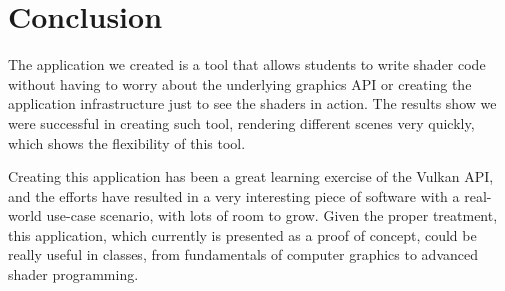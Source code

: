 \chapter{Conclusion}
The application we created is a tool that allows students to write shader code without having to worry about the underlying graphics API or creating the application infrastructure just to see the shaders in action. The results show we were successful in creating such tool, rendering different scenes very quickly, which shows the flexibility of this tool.

Creating this application has been a great learning exercise of the Vulkan API, and the efforts have resulted in a very interesting piece of software with a real-world use-case scenario, with lots of room to grow. Given the proper treatment, this application, which currently is presented as a proof of concept, could be really useful in classes, from fundamentals of computer graphics to advanced shader programming.
